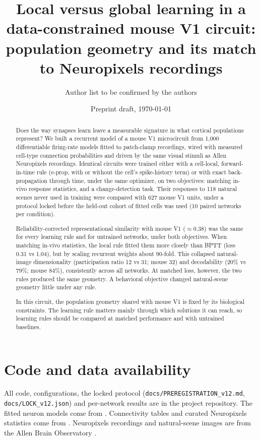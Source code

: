 \documentclass[11pt]{article}
\title{Local versus global learning in a data-constrained mouse V1 circuit: population geometry
and its match to Neuropixels recordings}
\author{Author list to be confirmed by the authors}
\date{Preprint draft, \today}
\begin{document}
\maketitle

\begin{abstract}
Does the way synapses learn leave a measurable signature in what cortical populations represent?
We built a recurrent model of a mouse V1 microcircuit from 1{,}000 differentiable firing-rate models
fitted to patch-clamp recordings, wired with measured cell-type connection probabilities and driven
by the same visual stimuli as Allen Neuropixels recordings. Identical circuits were trained either
with a cell-local, forward-in-time rule (e-prop, with or without the cell's spike-history term) or
with exact back-propagation through time, under the same optimizer, on two objectives: matching
in-vivo response statistics, and a change-detection task. Their responses to 118 natural scenes
never used in training were compared with 627 mouse V1 units, under a protocol locked before the
held-out cohort of fitted cells was used (10 paired networks per condition).

Reliability-corrected representational similarity with mouse V1 ($\approx$0.38) was the same for
every learning rule and for untrained networks, under both objectives. When matching in-vivo
statistics, the local rule fitted them more closely than BPTT (loss 0.31 vs 1.04), but by scaling
recurrent weights about 90-fold. This collapsed natural-image dimensionality (participation ratio 12
vs 31; mouse 32) and decodability (20\% vs 79\%; mouse 84\%), consistently across all networks. At
matched loss, however, the two rules produced the same geometry. A behavioral objective changed
natural-scene geometry little under any rule.

In this circuit, the population geometry shared with mouse V1 is fixed by its biological
constraints. The learning rule matters mainly through which solutions it can reach, so learning
rules should be compared at matched performance and with untrained baselines.
\end{abstract}






\section*{Code and data availability}
All code, configurations, the locked protocol (\texttt{docs/PREREGISTRATION\_v12.md},
\texttt{docs/LOCK\_v12.json}) and per-network results are in the project repository. The fitted
neuron models come from \citet{yeung2025gfr}. Connectivity tables and curated Neuropixels statistics
come from \citet{ito2026}. Neuropixels recordings and natural-scene images are from the Allen
Brain Observatory \citep{siegle2021}.



\end{document}
